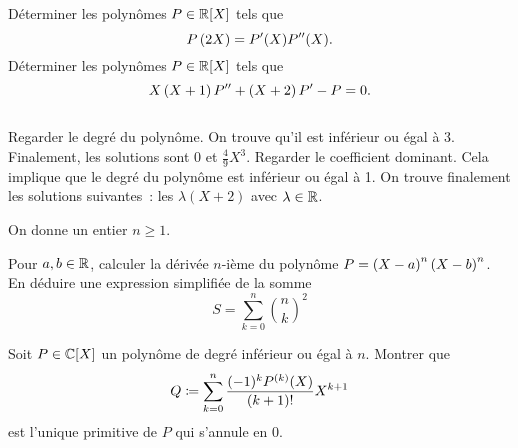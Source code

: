 \documentclass{magnolia}
\begin{document}
\begin{questions}
\question Déterminer les polynômes $P\in\polyR$ tels que
  \[P\left(2X\right)=P'(X)P''(X).\]
\question Déterminer les polynômes $P\in\polyR$ tels que
  \[X\left(X+1\right)P''+\left(X+2\right)P'-P=0.\]
\end{questions}
\begin{sol}
$\quad$
\begin{questions}
\question Regarder le degré du polynôme. On trouve qu'il est inférieur ou égal
  à 3. Finalement, les solutions sont $0$ et $\frac{4}{9}X^3$.
\question Regarder le coefficient dominant. Cela implique que le degré du
  polynôme est inférieur ou égal à 1. On trouve finalement les solutions
  suivantes~: les $\lambda(X+2)$ avec $\lambda\in\mathbb{R}$.
\end{questions}
\end{sol}



On donne un entier $n\geq 1$.
\begin{questions}
\question Pour $a,b\in\mathbb{R}$, calculer la dérivée $n$-ième du polynôme
  $P=\left(X-a\right)^n\left(X-b\right)^n$.
\question En déduire une expression simplifiée de la somme
  \[S=\sum_{k=0}^n \binom{n}{k}^2\]
\end{questions}


Soit $P\in\polyC$ un polynôme de degré inférieur ou égal à $n$. Montrer que
\[Q\coloneqq \sum_{k=0}^n \frac{(-1)^k P^{(k)}(X)}{(k+1)!}X^{k+1}\]
est l'unique primitive de $P$ qui s'annule en 0.














\end{document}
